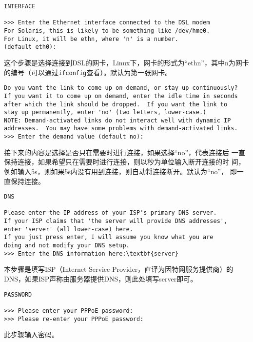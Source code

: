 \begin{Verbatim}[frame=single,commandchars=\\\{\}]
INTERFACE

>>> Enter the Ethernet interface connected to the DSL modem
For Solaris, this is likely to be something like /dev/hme0.
For Linux, it will be ethn, where 'n' is a number.
(default eth0): 
\end{Verbatim}
这个步骤是选择连接到DSL的网卡，Linux下，网卡的形式为``ethn''，其中n为网卡
的编号（可以通过\texttt{ifconfig}查看）。默认为第一张网卡。
\begin{Verbatim}[frame=single,commandchars=\\\{\}]
Do you want the link to come up on demand, or stay up continuously?
If you want it to come up on demand, enter the idle time in seconds
after which the link should be dropped.  If you want the link to
stay up permanently, enter 'no' (two letters, lower-case.)
NOTE: Demand-activated links do not interact well with dynamic IP
addresses.  You may have some problems with demand-activated links.
>>> Enter the demand value (default no): 
\end{Verbatim}
接下来的内容是选择是否只在需要时进行连接，如果选择``no''，代表连接后
一直保持连接，如果希望只在需要时进行连接，则以秒为单位输入断开连接的时
间，例如输入5s，则如果5s内没有用到连接，则自动将连接断开。默认为``no''，
即一直保持连接。
\begin{Verbatim}[frame=single,commandchars=\\\{\}]
DNS

Please enter the IP address of your ISP's primary DNS server.
If your ISP claims that 'the server will provide DNS addresses',
enter 'server' (all lower-case) here.
If you just press enter, I will assume you know what you are
doing and not modify your DNS setup.
>>> Enter the DNS information here:\textbf{server}
\end{Verbatim}
本步骤是填写ISP（Internet Service Provider，直译为因特网服务提供商）的
DNS，如果ISP声称由服务器提供DNS，则此处填写server即可。
\begin{Verbatim}[frame=single,commandchars=\\\{\}]
PASSWORD

>>> Please enter your PPPoE password:    
>>> Please re-enter your PPPoE password:
\end{Verbatim}
此步骤输入密码。
